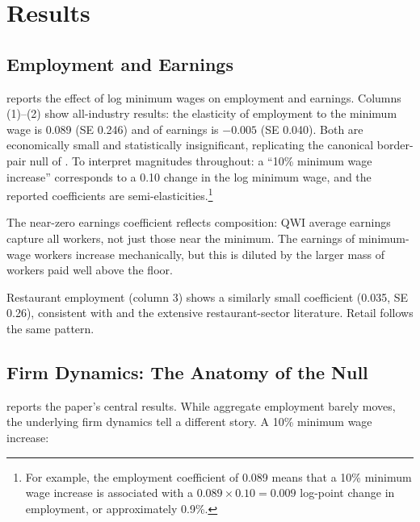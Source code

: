\documentclass[12pt]{article}
\begin{document}
\section{Results}

\subsection{Employment and Earnings}



 reports the effect of log minimum wages on employment and earnings. Columns (1)--(2) show all-industry results: the elasticity of employment to the minimum wage is 0.089 (SE 0.246) and of earnings is $-0.005$ (SE 0.040). Both are economically small and statistically insignificant, replicating the canonical border-pair null of \citet{dube2010minimum}. To interpret magnitudes throughout: a ``10\% minimum wage increase'' corresponds to a 0.10 change in the log minimum wage, and the reported coefficients are semi-elasticities.\footnote{For example, the employment coefficient of 0.089 means that a 10\% minimum wage increase is associated with a $0.089 \times 0.10 = 0.009$ log-point change in employment, or approximately 0.9\%.}

The near-zero earnings coefficient reflects composition: QWI average earnings capture all workers, not just those near the minimum. The earnings of minimum-wage workers increase mechanically, but this is diluted by the larger mass of workers paid well above the floor.

Restaurant employment (column 3) shows a similarly small coefficient (0.035, SE 0.26), consistent with \citet{card1994minimum} and the extensive restaurant-sector literature. Retail follows the same pattern.

\subsection{Firm Dynamics: The Anatomy of the Null}



 reports the paper's central results. While aggregate employment barely moves, the underlying firm dynamics tell a different story. A 10\% minimum wage increase:
\end{document}
